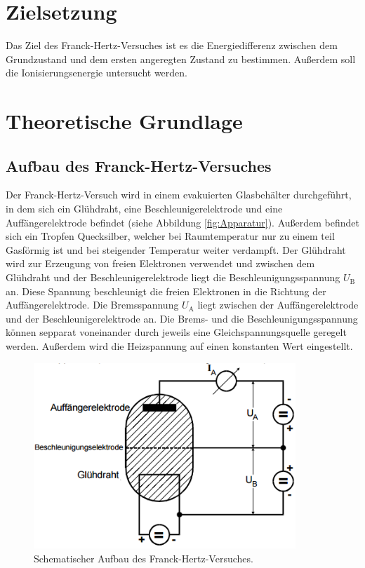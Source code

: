 \section{Zielsetzung}
Das Ziel des Franck-Hertz-Versuches ist es die Energiedifferenz zwischen dem Grundzustand und dem ersten angeregten Zustand zu bestimmen. Außerdem soll die Ionisierungsenergie untersucht werden.

\section{Theoretische Grundlage}
\label{sec:Theorie}
\subsection{Aufbau des Franck-Hertz-Versuches}
Der Franck-Hertz-Versuch wird in einem evakuierten Glasbehälter durchgeführt, in dem sich ein Glühdraht, eine Beschleunigerelektrode und eine Auffängerelektrode befindet (siehe Abbildung \eqref{fig:Apparatur}). Außerdem befindet sich ein Tropfen Quecksilber, welcher bei Raumtemperatur nur zu einem teil Gasförmig ist und bei steigender Temperatur weiter verdampft. Der Glühdraht wird zur Erzeugung von freien Elektronen verwendet und zwischen dem Glühdraht und der Beschleunigerelektrode liegt die Beschleunigungsspannung $U_\text{B}$ an. Diese Spannung beschleunigt die freien Elektronen in die Richtung der Auffängerelektrode. Die Bremsspannung $U_\text{A}$ liegt zwischen der Auffängerelektrode und der Beschleunigerelektrode an. Die Brems- und die Beschleunigungsspannung können sepparat voneinander durch jeweils eine Gleichspannungsquelle geregelt werden. Außerdem wird die Heizspannung auf einen konstanten Wert eingestellt.

\begin{figure}[H]
  \centering
  \includegraphics[height=7cm]{picture/Franck-Hertz-Apparatur}
  \caption{Schematischer Aufbau des Franck-Hertz-Versuches. \cite[2]{sample}}
  \label{fig:Apparatur}
\end{figure}

